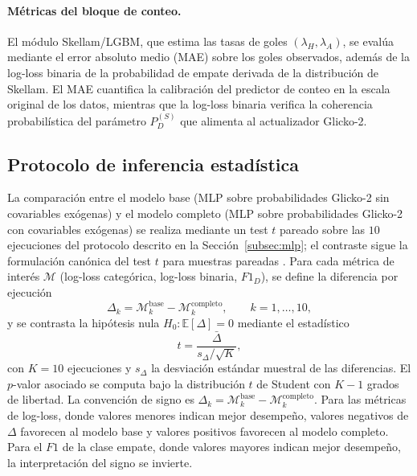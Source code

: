 \paragraph{M\'etricas del bloque de conteo.} El m\'odulo Skellam/LGBM, que estima las tasas de goles $(\lambda_H, \lambda_A)$, se eval\'ua mediante el error absoluto medio (MAE) sobre los goles observados, adem\'as de la log-loss binaria de la probabilidad de empate derivada de la distribuci\'on de Skellam. El MAE cuantifica la calibraci\'on del predictor de conteo en la escala original de los datos, mientras que la log-loss binaria verifica la coherencia probabil\'istica del par\'ametro $P_D^{(S)}$ que alimenta al actualizador Glicko-2.

\subsection{Protocolo de inferencia estad\'istica}
\label{subsec:test_t}

La comparaci\'on entre el modelo base (MLP sobre probabilidades Glicko-2 sin covariables ex\'ogenas) y el modelo completo (MLP sobre probabilidades Glicko-2 con covariables ex\'ogenas) se realiza mediante un test $t$ pareado sobre las $10$ ejecuciones del protocolo descrito en la Secci\'on~\ref{subsec:mlp}; el contraste sigue la formulaci\'on can\'onica del test $t$ para muestras pareadas \cite{hernandezBenito}. Para cada m\'etrica de inter\'es $\mathcal{M}$ (log-loss categ\'orica, log-loss binaria, $F1_D$), se define la diferencia por ejecuci\'on
\begin{equation}
	\Delta_k = \mathcal{M}_k^{\text{base}} - 
	\mathcal{M}_k^{\text{completo}}, \qquad k = 1, \dots, 10,
\end{equation}
y se contrasta la hip\'otesis nula $H_0: \mathbb{E}[\Delta] = 0$ mediante el estad\'istico
\begin{equation}
	t = \frac{\bar{\Delta}}{s_{\Delta}/\sqrt{K}},
\end{equation}
con $K=10$ ejecuciones y $s_{\Delta}$ la desviaci\'on est\'andar muestral de las diferencias. El $p$-valor asociado se computa bajo la distribuci\'on $t$ de Student con $K-1$ grados de libertad. La convenci\'on de signo es $\Delta_k = \mathcal{M}_k^{\text{base}} - \mathcal{M}_k^{\text{completo}}$. Para las m\'etricas de log-loss, donde valores menores indican mejor desempe\~no, valores negativos de $\Delta$ favorecen al modelo base y valores positivos favorecen al modelo completo. Para el $F1$ de la clase empate, donde valores mayores indican mejor desempe\~no, la interpretaci\'on del signo se invierte.

